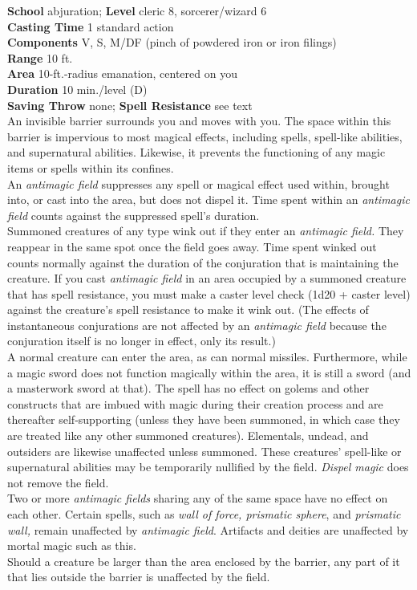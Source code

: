 \textbf{School} abjuration; \textbf{Level} cleric 8, sorcerer/wizard 6\\
\textbf{Casting Time} 1 standard action\\
\textbf{Components} V, S, M/DF (pinch of powdered iron or iron filings)\\
\textbf{Range} 10 ft.\\
\textbf{Area} 10-ft.-radius emanation, centered on you\\
\textbf{Duration} 10 min./level (D)\\
\textbf{Saving Throw} none; \textbf{Spell Resistance} see text\\
An invisible barrier surrounds you and moves with you. The space within this barrier is impervious to most magical effects, including spells, spell-like abilities, and supernatural abilities. Likewise, it prevents the functioning of any magic items or spells within its confines.\\
An \textit{antimagic field }suppresses any spell or magical effect used within, brought into, or cast into the area, but does not dispel it. Time spent within an \textit{antimagic field }counts against the suppressed spell's duration.\\
Summoned creatures of any type wink out if they enter an \textit{antimagic field. }They reappear in the same spot once the field goes away. Time spent winked out counts normally against the duration of the conjuration that is maintaining the creature. If you cast \textit{antimagic field }in an area occupied by a summoned creature that has spell resistance, you must make a caster level check (1d20 + caster level) against the creature's spell resistance to make it wink out. (The effects of instantaneous conjurations are not affected by an \textit{antimagic field }because the conjuration itself is no longer in effect, only its result.)\\
A normal creature can enter the area, as can normal missiles. Furthermore, while a magic sword does not function magically within the area, it is still a sword (and a masterwork sword at that). The spell has no effect on golems and other constructs that are imbued with magic during their creation process and are thereafter self-supporting (unless they have been summoned, in which case they are treated like any other summoned creatures). Elementals, undead, and outsiders are likewise unaffected unless summoned. These creatures' spell-like or supernatural abilities may be temporarily nullified by the field. \textit{Dispel magic }does not remove the field.\\
Two or more \textit{antimagic fields }sharing any of the same space have no effect on each other. Certain spells, such as \textit{wall of force, prismatic sphere}, and \textit{prismatic wall, }remain unaffected by \textit{antimagic field}. Artifacts and deities are unaffected by mortal magic such as this. \\
Should a creature be larger than the area enclosed by the barrier, any part of it that lies outside the barrier is unaffected by the field.\\
